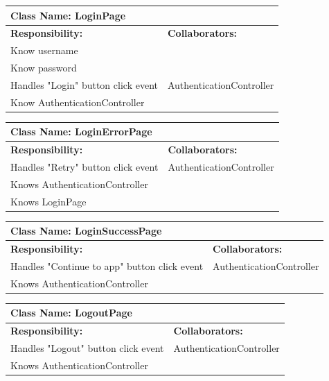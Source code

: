\documentclass[]{article}
\begin{document}
	\begin{table}[H]
	\centering
	\begin{tabular}{|p{6cm}|p{6cm}|}
	\hline 
		\multicolumn{2}{|l|}{\textbf{Class Name: LoginPage}} \\
	\hline
	\textbf{Responsibility:} & \textbf{Collaborators:} \\
	\hline
	Know username & \\ \hline
	Know password & \\ \hline
	Handles "Login" button click event  & AuthenticationController\\ \hline
	Know AuthenticationController &\\ \hline
	\end{tabular}
	\end{table}

	\begin{table}[H]
	\centering
	\begin{tabular}{|p{6cm}|p{6cm}|}
	\hline 
		\multicolumn{2}{|l|}{\textbf{Class Name: LoginErrorPage}} \\
	\hline
	\textbf{Responsibility:} & \textbf{Collaborators:} \\
	\hline
	Handles "Retry" button click event  & AuthenticationController\\ \hline 
	Knows AuthenticationController &\\ \hline
	Knows LoginPage &\\ \hline
	\end{tabular}
	\end{table}

	
	\begin{table}[H]
	\centering
	\begin{tabular}{|p{6cm}|p{6cm}|}
	\hline 
		\multicolumn{2}{|l|}{\textbf{Class Name: LoginSuccessPage}} \\
	\hline
	\textbf{Responsibility:} & \textbf{Collaborators:} \\
	\hline
	Handles "Continue to app" button click event&AuthenticationController\\ \hline
	Knows AuthenticationController &\\ \hline
	\end{tabular}
	\end{table}
	

	\begin{table}[H]
	\centering
	\begin{tabular}{|p{6cm}|p{6cm}|}
	\hline 
		\multicolumn{2}{|l|}{\textbf{Class Name: LogoutPage}} \\
	\hline
	\textbf{Responsibility:} & \textbf{Collaborators:} \\
	\hline 
	Handles "Logout" button click event  & AuthenticationController\\ \hline
	Knows AuthenticationController & \\ \hline
	\end{tabular}
	\end{table}
\end{document}
